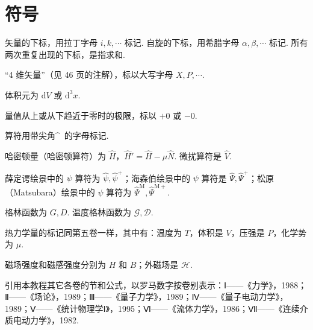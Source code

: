 \chapter*{符\quad 号}

矢量的下标，用拉丁字母 $i,k,\cdots$ 标记. 自旋的下标，用希腊字母 $\alpha,\beta,\cdots$ 标记. 所有两次重复出现的下标，是指求和.

``4 维矢量''（见 46 页的注解），标以大写字母 $X,P,\cdots$.

体积元为 $\mathrm{d}V$ 或 $\mathrm{d}^3x$.

量值从上或从下趋近于零时的极限，标以 $+0$ 或 $-0$.

算符用带尖角\^{ }\ 的字母标记.

哈密顿量（哈密顿算符）为 $\hat{H}$，$\hat{H}'=\hat{H}-\mu\hat{N}$. 微扰算符是 $\hat{V}$.

薛定谔绘景中的 $\psi$ 算符为 $\hat{\psi},\hat{\psi}^{+}$；海森伯绘景中的 $\psi$ 算符是 $\hat{\Psi},\hat{\Psi}^{+}$；松原（Matsubara）绘景中的 $\psi$ 算符为 $\hat{\Psi}^{\mathrm{M}},\hat{\Psi}^{\mathrm{M}+}$.

格林函数为 $G,D$. 温度格林函数为 $\mathcal{G},\mathcal{D}$.

热力学量的标记同第五卷一样，其中有：温度为 $T$，体积是 $V$，压强是 $P$，化学势为 $\mu$.

磁场强度和磁感强度分别为 $H$ 和 $B$；外磁场是 $\mathcal{H}$.

引用本教程其它各卷的节和公式，以罗马数字按卷别表示：Ⅰ——《力学》，1988；Ⅱ——《场论》，1989；Ⅲ——《量子力学》，1989；Ⅳ——《量子电动力学》，1989；Ⅴ——《统计物理学Ⅰ》，1995；Ⅵ——《流体力学》，1986；Ⅶ——《连续介质电动力学》，1982.
